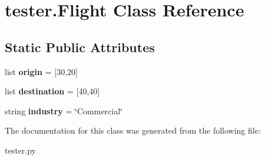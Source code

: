 \hypertarget{classtester_1_1_flight}{}\section{tester.\+Flight Class Reference}
\label{classtester_1_1_flight}
\subsection*{Static Public Attributes}
\begin{DoxyCompactItemize}
\item 
\mbox{\label{classtester_1_1_flight_a7b8489e54e35957111e7cb3702e07e71}} 
list {\bfseries origin} = \mbox{[}30,20\mbox{]}
\item 
\mbox{\label{classtester_1_1_flight_a08463b021bb16f187e89476232de6787}} 
list {\bfseries destination} = \mbox{[}40,40\mbox{]}
\item 
\mbox{\label{classtester_1_1_flight_ae8161a3f383172fcfb04c0c0f338e6f4}} 
string {\bfseries industry} = \char`\"{}Commercial\char`\"{}
\end{DoxyCompactItemize}


The documentation for this class was generated from the following file\+:\begin{DoxyCompactItemize}
\item 
tester.\+py\end{DoxyCompactItemize}
